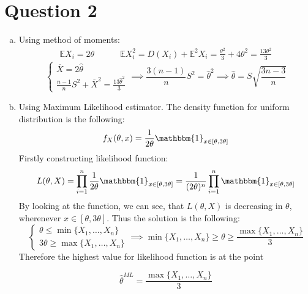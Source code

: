 \documentclass[11pt, oneside]{article}
\newcommand{\E}{\mathbb{E}}
\begin{document}
\clearpage
\section*{Question 2}
\begin{enumerate}[(a)]
	\item Using method of moments:
	\begin{gather*}
		\E X_{i} = 2\theta \quad\quad\quad \E X_{i}^{2} = D(X_{i}) + \E^{2}X_{i} = \frac{\theta^{2}}{3} + 4\theta^{2} = \frac{13\theta^{2}}{3}
	\end{gather*}
	\[
	\begin{cases}
	\overline{X} = 2\hat\theta\\ \frac{n-1}{n}S^{2} + \overline{X}^{2} = \frac{13\hat\theta^{2}}{3}
	\end{cases} \implies \frac{3(n-1)}{n}S^{2} = \hat\theta^{2} \implies \hat\theta = S \sqrt{\frac{3n - 3}{n}}
	\]
	\item Using Maximum Likelihood estimator.
	The density function for uniform distribution is the following:
	\[
	f_{X}(\theta, x) = \frac{1}{2\theta}\mathbbm{1}_{x\in[\theta, 3\theta]}
	\]
	Firstly constructing likelihood function:
	\[
	L(\theta, X) = \prod_{i=1}^{n}  \frac{1}{2\theta}\mathbbm{1}_{x\in[\theta, 3\theta]} = \frac{1}{(2\theta)^{n}}\prod_{i=1}^{n} \mathbbm{1}_{x\in[\theta, 3\theta]}
	\]
	By looking at the function, we can see, that $ L(\theta, X) $ is decreasing in $ \theta $, wherenever $ x\in[\theta, 3\theta] $.  Thus the solution is the following:
	\[
	\begin{cases}
		\theta \le \min \{X_{1}, \dots, X_{n}\}\\
		3\theta \ge \max \{X_{1}, \dots, X_{n}\}
	\end{cases} \implies \min \{X_{1}, \dots, X_{n}\}  \ge \theta \ge \frac{\max \{X_{1}, \dots, X_{n}\}}{3}
	\]
	Therefore the highest value for likelihood function is at the point
	
	\[
	\hat\theta^{ML} = \frac{\max\{X_{1}, \dots, X_{n}\}}{3}
	\] 
	
\end{enumerate}
\clearpage
\end{document}
